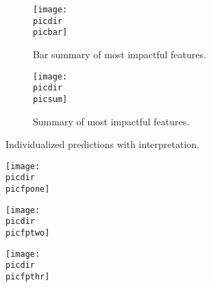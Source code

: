 \begin{figure}
\begin{adjustbox}{minipage={\linewidth},frame}
\begin{subfigure}[t]{.45\linewidth}
    \vspace{2.5mm}
    \centering
    \captionsetup[subfigure]{}
    \caption{Bar summary of most impactful features.}\label{fig:shapsumbarlos5d}
    \texttt{[image: \\picdir\\picbar]}
\end{subfigure}
\begin{subfigure}[t]{.45\linewidth}
    \vspace{2.5mm}
    \centering
    \captionsetup[subfigure]{}
    \caption{Summary of most impactful features.}\label{fig:shapsumlos5d}
    \vspace{-2.3mm}
    \texttt{[image: \\picdir\\picsum]}
    \vspace{2.0mm}
\end{subfigure}
\textsf{Individualized predictions with interpretation.}
\vspace{-2.5mm}
\begin{subfigure}[t]{0.1\textwidth}
    \caption{}\label{fig:shapforcelos5d1}
    \end{subfigure}%
    \begin{minipage}[c]{0.9\textwidth}
    \texttt{[image: \\picdir\\picfpone]}
    \vspace{-2.5mm}
\end{minipage}
\begin{subfigure}[t]{0.1\textwidth}
    \caption{}\label{fig:shapforcelos5d2}
    \end{subfigure}%
    \begin{minipage}[c]{0.9\textwidth}
    \texttt{[image: \\picdir\\picfptwo]}
    \vspace{-3.5mm}
\end{minipage}
\vspace{-4.5mm}
\begin{subfigure}[t]{0.1\textwidth}
    \caption{}\label{fig:shapforcelos5d3}
    \end{subfigure}%
    \begin{minipage}[c]{0.9\textwidth}
    \texttt{[image: \\picdir\\picfpthr]}
    \vspace{-2.5mm}
\end{minipage}
\vspace{-2.5mm}


\end{adjustbox}
\end{figure}
